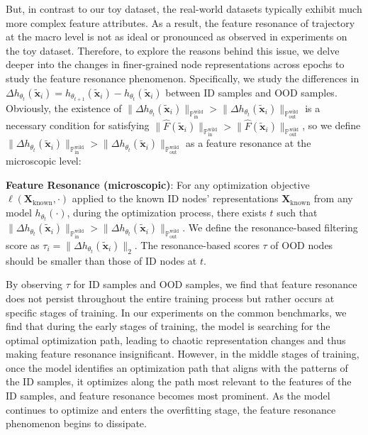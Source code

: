 But, in contrast to our toy dataset, the real-world datasets typically exhibit much more complex feature attributes.
As a result, the feature resonance of trajectory at the macro level is not as ideal or pronounced as observed in experiments on the toy dataset. Therefore, to explore the reasons behind this issue, we delve deeper into the changes in finer-grained node representations across epochs to study the feature resonance phenomenon. Specifically, we study the differences in $\Delta h_{\theta_t}(\tilde{\mathbf{x}}_i) = h_{\theta_{t+1}}(\tilde{\mathbf{x}}_i) - h_{\theta_t}(\tilde{\mathbf{x}}_i)$ between ID samples and OOD samples. Obviously, the existence of $\parallel \Delta h_{\theta_t}(\tilde{\mathbf{x}}_i)\parallel_{\mathbb{P}^{\mathrm{wild}}_{\mathrm{in}}} > \parallel \Delta h_{\theta_t}(\tilde{\mathbf{x}}_i)\parallel_{\mathbb{P}^{\mathrm{wild}}_{\mathrm{out}}}$ is a necessary condition for satisfying $\parallel \hat{F}(\tilde{\mathbf{x}}_i) \parallel_{\mathbb{P}^{\mathrm{wild}}_{\mathrm{in}}} > \parallel \hat{F}(\tilde{\mathbf{x}}_i) \parallel_{\mathbb{P}^{\mathrm{wild}}_{\mathrm{out}}}$, so we define $\parallel \Delta h_{\theta_t}(\tilde{\mathbf{x}}_i)\parallel_{\mathbb{P}^{\mathrm{wild}}_{\mathrm{in}}} > \parallel \Delta h_{\theta_t}(\tilde{\mathbf{x}}_i)\parallel_{\mathbb{P}^{\mathrm{wild}}_{\mathrm{out}}}$ as a feature resonance at the microscopic level:
\begin{definition}
    \textbf{Feature Resonance (microscopic)}: For any optimization objective $ \ell(\boldsymbol{ X}_{\text{known}},\cdot)$ applied to the known ID nodes' representations $\boldsymbol{X}_{\text{known}}$ from any model $h_{\theta_t}(\cdot)$, during the optimization process, there exists $t$ such that  $\parallel \Delta h_{\theta_t}(\tilde{\mathbf{x}}_i)\parallel_{\mathbb{P}^{\mathrm{wild}}_{\mathrm{in}}} > \parallel \Delta h_{\theta_t}(\tilde{\mathbf{x}}_i)\parallel_{\mathbb{P}^{\mathrm{wild}}_{\mathrm{out}}}$. We define the resonance-based filtering score as $\tau_i = \parallel \Delta h_{\theta_t}(\tilde{\mathbf{x}}_i) \parallel_2$. The resonance-based scores $\tau$ of OOD nodes should be smaller than those of ID nodes at $t$.
\end{definition}
By observing $\tau$ for ID samples and OOD samples, we find that feature resonance does not persist throughout the entire training process but rather occurs at specific stages of training. In our experiments on the common benchmarks, we find that during the early stages of training, the model is searching for the optimal optimization path, leading to chaotic representation changes and thus making feature resonance insignificant.  However, in the middle stages of training, once the model identifies an optimization path that aligns with the patterns of the ID samples, it optimizes along the path most relevant to the features of the ID samples, and feature resonance becomes most prominent. As the model continues to optimize and enters the overfitting stage, the feature resonance phenomenon begins to dissipate. 
